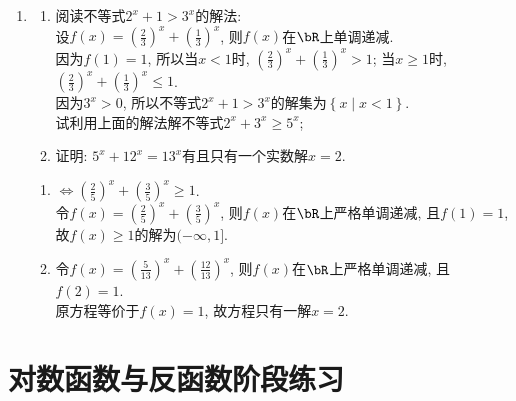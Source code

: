 \begin{enumerate}
\begin{enumerate}
\item 
\begin{enumerate}[(1)]
\item 阅读不等式$2^x+1>3^x$的解法: \\
设$f(x)=(\frac{2}{3})^x+(\frac{1}{3})^x$, 则$f(x)$在$\bR$上单调递减. \\
因为$f(1)=1$, 所以当$x<1$时, $(\frac{2}{3})^x+(\frac{1}{3})^x>1$; 当$x\geq 1$时, $(\frac{2}{3})^x+(\frac{1}{3})^x\leq 1$.\\
因为$3^x>0$, 所以不等式$2^x+1>3^x$的解集为$\left\{x\mid x<1\right\}$. \\
试利用上面的解法解不等式$2^x+3^x\geq 5^x$; 

\item 证明: $5^x+12^x=13^x$有且只有一个实数解$x=2$. 
\end{enumerate}
\begin{jieda}
\begin{enumerate}[(1)]
\item $\iff(\frac{2}{5})^x+(\frac{3}{5})^x\geq 1$. \\
令$f(x)=(\frac{2}{5})^x+(\frac{3}{5})^x$, 则$f(x)$在$\bR$上严格单调递减, 且$f(1)=1$, \\
故$f(x)\geq 1$的解为$(-\infty,1]$. 

\item 令$f(x)=(\frac{5}{13})^x+(\frac{12}{13})^x$, 则$f(x)$在$\bR$上严格单调递减, 且$f(2)=1$. \\
原方程等价于$f(x)=1$, 故方程只有一解$x=2$. 
\end{enumerate}
\end{jieda}


\end{enumerate}

\end{enumerate}


 \section{对数函数与反函数阶段练习}

